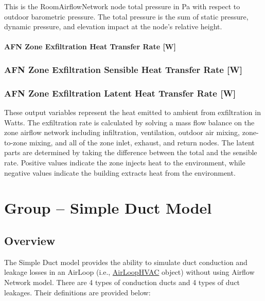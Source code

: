 This is the RoomAirflowNetwork node total pressure in Pa with respect to outdoor barometric pressure. The total pressure is the sum of static pressure, dynamic pressure, and elevation impact at the node's relative height.

\paragraph{AFN Zone Exfiltration Heat Transfer Rate {[}W{]}}\label{afn-zone-exfiltration-heat-transfer-rate-w}

\subsubsection{AFN Zone Exfiltration Sensible Heat Transfer Rate {[}W{]}}\label{afn-zone-exfiltration-sensible-heat-transfer-rate-w}

\subsubsection{AFN Zone Exfiltration Latent Heat Transfer Rate {[}W{]}}\label{afn-zone-exfiltration-latent-heat-transfer-rate-w}

These output variables represent the heat emitted to ambient from exfiltration in Watts. The exfiltration rate is calculated by solving a mass flow balance on the zone airflow network including infiltration, ventilation, outdoor air mixing, zone-to-zone mixing, and all of the zone inlet, exhaust, and return nodes. The latent parts are determined by taking the difference between the total and the sensible rate. Positive values indicate the zone injects heat to the environment, while negative values indicate the building extracts heat from the environment.


\section{Group -- Simple Duct Model}\label{group-simple-duct-model}

\subsection{Overview}\label{overview-ductloss}

The Simple Duct model provides the ability to simulate duct conduction and leakage losses in an AirLoop  (i.e., \hyperref[airloophvac]{AirLoopHVAC} object) without using Airflow Network model. There are 4 types of conduction ducts and 4 types of duct leakages. Their definitions are provided below:

